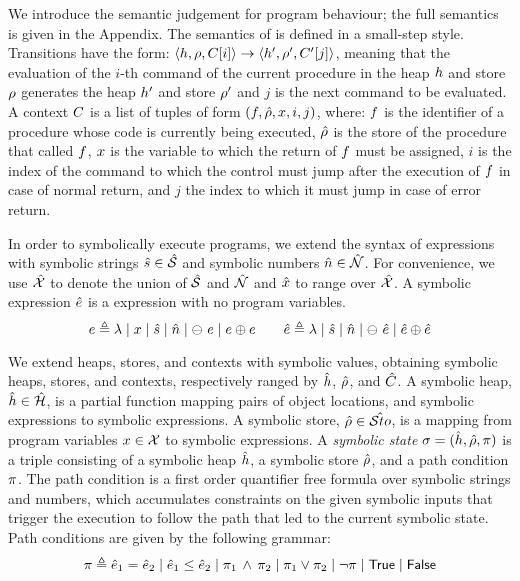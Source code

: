 We introduce the \jsil semantic judgement for program behaviour; %
the full \jsil semantics is given in the Appendix. 
The semantics of \jsil is defined in a small-step style. 
Transitions have the form:  $\langle h, \rho, C[i] \rangle \rightarrow \langle h', \rho', C'[j] \rangle$, 
meaning that the evaluation of the $i$-th command of the current procedure in 
the heap $h$ and store $\rho$ generates the heap $h'$ and store $\rho'$ 
and $j$ is the next command to be evaluated. 
A context $C$ is  a list of tuples of form $(f, \hat\rho, x, i, j)$, where: 
 $f$ is the identifier of a procedure whose code is currently being executed, 
 $\hat\rho$ is the store of the procedure that called $f$,  $x$ is 
the variable to which the return of $f$ must be assigned,  $i$ is the index 
of the command to which the control must jump after the execution of $f$ in 
case of normal return, and  $j$ the index to which it must jump in case of 
error return. 


In order to symbolically execute \jsil programs, we extend the syntax of \jsil expressions with 
symbolic strings $\hat{s} \in \hat{\mathcal{S}}$ and symbolic numbers $\hat{n} \in \hat{\mathcal{N}}$. 
For convenience, we use $\hat{\mathcal{X}}$ to denote the union of $\hat{\mathcal{S}}$ and $\hat{\mathcal{N}}$ 
and $\hat{x}$ to range over $\hat{\mathcal{X}}$. 
A symbolic expression $\hat{e}$ is a \jsil expression with no program variables. 
\begin{equation}
e \triangleq \lambda \mid x \mid \hat{s} \mid \hat{n} \mid \ominus\ e \mid e \oplus e
\qquad 
\hat{e} \triangleq \lambda \mid \hat{s} \mid \hat{n} \mid \ominus\ \hat{e} \mid \hat{e} \oplus \hat{e}
\end{equation}

We extend heaps, stores, and contexts with symbolic values, obtaining symbolic 
heaps, stores, and contexts, respectively ranged by $\hat{h}$, $\hat\rho$, and $\hat{C}$. 
A symbolic heap, $\hat{h} \in \hat{\mathcal H}$, is a partial function mapping pairs of  
object locations, and symbolic expressions to symbolic expressions. 
A symbolic store, $\hat\rho \in \hat{{\mathcal S}to}$, is a mapping from program variables 
$x \in \mathcal{X}$ to symbolic expressions.
%
A \emph{symbolic state} $\sigma = (\hat{h}, \hat\rho, \pi)$ is a triple consisting of a 
symbolic heap $\hat{h}$, a symbolic store $\hat\rho$, and a path condition $\pi$. 
The path condition is a first order quantifier free formula over symbolic strings and 
numbers, which accumulates constraints on the given symbolic inputs that trigger 
the execution to follow the path that led to the current symbolic state. 
Path conditions are given by the following grammar: 
\begin{equation}
\pi \triangleq \hat{e}_1 = \hat{e}_2 \mid \hat{e}_1 \leq \hat{e}_2 \mid \pi_1 \, \wedge \, \pi_2 \mid \pi_1 \vee \pi_2 \mid \neg \pi \mid \mathsf{True} \mid \mathsf{False}
\end{equation}

